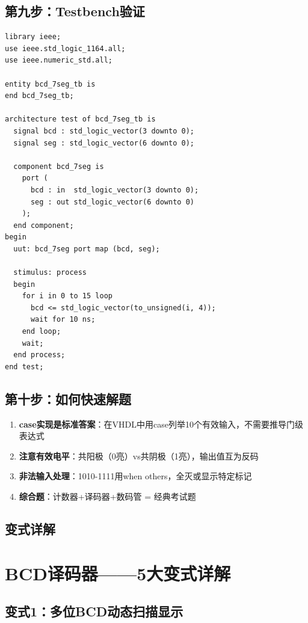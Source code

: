 \section{第九步：Testbench验证}

\begin{lstlisting}[caption={BCD-7段译码器Testbench}]
library ieee;
use ieee.std_logic_1164.all;
use ieee.numeric_std.all;

entity bcd_7seg_tb is
end bcd_7seg_tb;

architecture test of bcd_7seg_tb is
  signal bcd : std_logic_vector(3 downto 0);
  signal seg : std_logic_vector(6 downto 0);

  component bcd_7seg is
    port (
      bcd : in  std_logic_vector(3 downto 0);
      seg : out std_logic_vector(6 downto 0)
    );
  end component;
begin
  uut: bcd_7seg port map (bcd, seg);

  stimulus: process
  begin
    for i in 0 to 15 loop
      bcd <= std_logic_vector(to_unsigned(i, 4));
      wait for 10 ns;
    end loop;
    wait;
  end process;
end test;
\end{lstlisting}

\section{第十步：如何快速解题}

\begin{examtip}[BCD译码器快速解题法]
\begin{enumerate}
  \item \textbf{case实现是标准答案}：在VHDL中用case列举10个有效输入，不需要推导门级表达式
  \item \textbf{注意有效电平}：共阳极（0亮）vs共阴极（1亮），输出值互为反码
  \item \textbf{非法输入处理}：1010-1111用when others，全灭或显示特定标记
  \item \textbf{综合题}：计数器+译码器+数码管 = 经典考试题
\end{enumerate}
\end{examtip}

\section{变式详解}
\chapter{BCD译码器——5大变式详解}

\section{变式1：多位BCD动态扫描显示}

